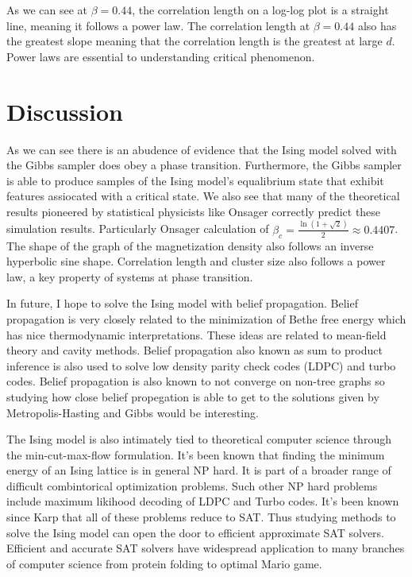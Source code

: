 \documentclass{article}
\begin{document}
As we can see at $\beta=0.44$, the correlation length on a log-log plot is a straight line, meaning it follows
a power law. The correlation length at $\beta = 0.44$ also has the greatest slope meaning that the correlation length
is the greatest at large $d$.
Power laws are essential to understanding critical phenomenon. 


\section{Discussion}
As we can see there is an abudence of evidence that the Ising model solved with the Gibbs sampler does obey a phase transition. Furthermore,
the Gibbs sampler is able to produce samples of the Ising model's equalibrium state that exhibit features assiocated with a critical state. 
We also see that many of the theoretical results pioneered by statistical physicists like Onsager correctly predict these simulation results. 
Particularly Onsager calculation of $\beta_c = \frac{\ln(1+\sqrt{2})}{2} \approx 0.4407 $. The shape of the graph of the magnetization density also 
follows an inverse hyperbolic sine shape. Correlation length and cluster size also follows a power law, a key property of systems at phase transition.

In future, I hope to solve the Ising model with belief propagation. Belief propagation is very closely related to the minimization of Bethe free energy
which has nice thermodynamic interpretations. These ideas are related to mean-field theory and cavity methods. Belief propagation also known as sum to product inference is also used to solve low density parity check codes (LDPC)
and turbo codes. Belief propagation is also known to not converge on non-tree graphs so studying how close belief propegation is able to get to the solutions given 
by Metropolis-Hasting and Gibbs would be interesting.

The Ising model is also intimately tied to theoretical computer science through the min-cut-max-flow formulation. It's been known that finding the minimum
energy of an Ising lattice is in general NP hard. It is part of a broader range of difficult combintorical optimization problems. Such other NP hard problems
include maximum likihood decoding of LDPC and Turbo codes. It's been known since Karp that all of these problems reduce to SAT. Thus studying methods to solve the
Ising model can open the door to efficient approximate SAT solvers. Efficient and accurate SAT solvers have widespread application to many branches of computer science
from protein folding to optimal Mario game.
\end{document}
